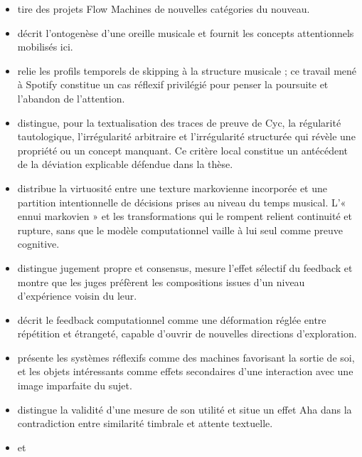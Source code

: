 \documentclass[11pt,a4paper]{article}
\begin{document}
\begin{itemize}
        \emph{templagiarism}.
  \item \textcite{pachet2021assisted} tire des projets Flow Machines de nouvelles
        catégories du nouveau.
  \item \textcite{pachet2018oreille} décrit l'ontogenèse d'une oreille musicale
        et fournit les concepts attentionnels mobilisés ici.
  \item \textcite{montecchio2020skipping} relie les profils temporels de
        skipping à la structure musicale ; ce travail mené à Spotify constitue
        un cas réflexif privilégié pour penser la poursuite et l'abandon de
        l'attention.
  \item \textcite{milipachet1995regularity} distingue, pour la textualisation
        des traces de preuve de Cyc, la régularité tautologique, l'irrégularité
        arbitraire et l'irrégularité structurée qui révèle une propriété ou un
        concept manquant. Ce critère local constitue un antécédent de la
        déviation explicable défendue dans la thèse.
  \item \textcite{pachet2012virtuosity} distribue la virtuosité entre une
        texture markovienne incorporée et une partition intentionnelle de
        décisions prises au niveau du temps musical. L'« ennui markovien » et
        les transformations qui le rompent relient continuité et rupture, sans
        que le modèle computationnel vaille à lui seul comme preuve cognitive.
  \item \textcite{martin2016creativeprocess} distingue jugement propre et
        consensus, mesure l'effet sélectif du feedback et montre que les juges
        préfèrent les compositions issues d'un niveau d'expérience voisin du leur.
  \item \textcite{jones2009stimulating} décrit le feedback computationnel comme
        une déformation réglée entre répétition et étrangeté, capable d'ouvrir de
        nouvelles directions d'exploration.
  \item \textcite{pachet2008machines} présente les systèmes réflexifs comme des
        machines favorisant la sortie de soi, et les objets intéressants comme
        effets secondaires d'une interaction avec une image imparfaite du sujet.\par
  \item \textcite{aucouturier2002similarity} distingue la validité d'une mesure
        de son utilité et situe un effet Aha dans la contradiction entre
        similarité timbrale et attente textuelle.
  \item \textcite{pachetroy2008hitsong} et \textcite{pachet2011hitsong}

\end{itemize}
\end{document}
